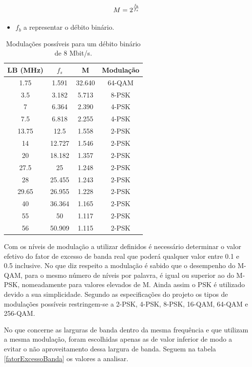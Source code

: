 \begin{equation}
\centering
M=2^\frac{f_{b}}{f_{s}}
\end{equation}

\begin{itemize}
\item $f_{b}$ a representar o débito binário. 
\end{itemize}

\begin{table}[H]
\centering
\begin{tabular}{|c|c|c|c|}
\hline
LB (MHz) & $f_{s}$ & M &  Modulação\\
\hline
1.75 & 1.591 & 32.640 & 64-QAM\\
3.5 & 3.182 & 5.713 & 8-PSK\\
7 & 6.364 & 2.390 & 4-PSK\\
7.5 & 6.818 & 2.255 & 4-PSK\\
13.75 & 12.5 & 1.558 & 2-PSK\\
14 & 12.727 & 1.546 & 2-PSK\\
20 & 18.182 & 1.357 & 2-PSK\\
27.5 & 25 & 1.248 & 2-PSK\\
28 & 25.455 & 1.243 & 2-PSK\\
29.65 & 26.955 & 1.228 & 2-PSK\\
40 & 36.364 & 1.165 & 2-PSK\\
55 & 50 & 1.117 & 2-PSK\\
56 & 50.909 & 1.115 & 2-PSK\\
\hline
\end{tabular}
\caption{Modulações possíveis para um débito binário de 8 Mbit/s.}
\label{modulação}
\end{table}

Com os níveis de modulação a utilizar definidos é necessário determinar o valor efetivo do fator de excesso de banda real que poderá qualquer valor entre 0.1 e 0.5 inclusive. No que diz respeito a modulação é sabido que o desempenho do M-QAM, para o mesmo número de níveis por palavra, é igual ou superior ao do M-PSK, nomeadamente para valores elevados de M. Ainda assim o PSK é utilizado devido a sua simplicidade. Segundo as especificações do projeto os tipos de modulações possíveis restringem-se a 2-PSK, 4-PSK, 8-PSK, 16-QAM, 64-QAM e 256-QAM.

No que concerne as larguras de banda dentro da mesma frequência e que utilizam a mesma modulação, foram escolhidas apenas as de valor inferior de modo a evitar o não aproveitamento dessa largura de banda.
Seguem na tabela \ref{fatorExcessoBanda} os valores a analisar.

